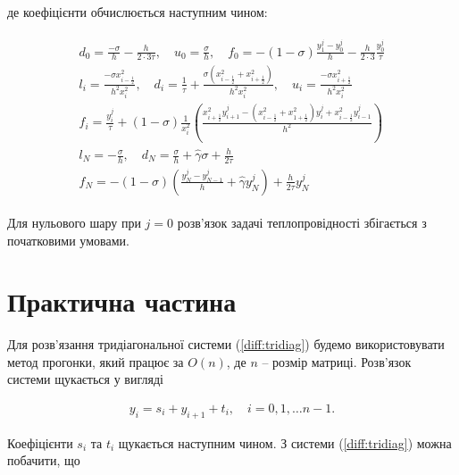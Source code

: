 де коефіцієнти обчислюється наступним чином:

\begin{align} \label{diff:tridiag}
\begin{split}
d_0 = \frac{-\sigma}{h} - \frac{h}{2 \cdot 3\tau}, \quad u_0 = \frac{\sigma}{h}, \quad f_0 = -(1-\sigma)\frac{y_1^j - y_0^j}{h} - \frac{h}{2 \cdot 3} \frac{y_0^j}{\tau} \\
l_i = \frac{-\sigma x_{i-\frac{1}{2}}^2}{h^2 x_i^2}, \quad d_i = \frac{1}{\tau} + \frac{\sigma \left( x_{i-\frac{1}{2}}^2 +x_{i+\frac{1}{2}}^2 \right)}{h^2 x_i^2}, \quad u_i = \frac{-\sigma x_{i+\frac{1}{2}}^2}{h^2 x_i^2}\\
f_i =\frac{y_i^j}{\tau} + (1-\sigma)\frac{1}{x_i^2} \left( \frac{x_{i+\frac{1}{2}}^2 y_{i+1}^j - \left( x_{i-\frac{1}{2}}^2 + x_{1+\frac{1}{2}}^2 \right)y_i^j + x_{i-\frac{1}{2}}^2 y_{i-1}^j }{h^2}\right)\\
l_N = -\frac{\sigma}{h}, \quad d_N = \frac{\sigma}{h} + \hat{\gamma}\sigma + \frac{h}{2\tau}\\f_N = -(1-\sigma)\left( \frac{y_N^j - y_{N-1}^j}{h} + \hat{\gamma}y_N^j\right) + \frac{h}{2\tau}y_N^j
\end{split}
\end{align}

Для нульового шару при \(j = 0\) розв'язок задачі теплопровідності збігається з початковими умовами.


\section{Практична частина}

Для розв'язання тридіагональної системи (\ref{diff:tridiag}) будемо використовувати метод прогонки, який працює за \(O(n)\), де \( n \) -- розмір матриці. Розв'язок системи щукається у вигляді

\begin{equation}
\begin{multlined} \label{diff:solve_tridiag}
y_i = s_i + y_{i+1} + t_i, \quad i = 0, 1, \dots n-1.
\end{multlined}
\end{equation}

Коефіцієнти \(s_i\) та \(t_i\) щукається наступним чином. З системи (\ref{diff:tridiag}) можна побачити, що

